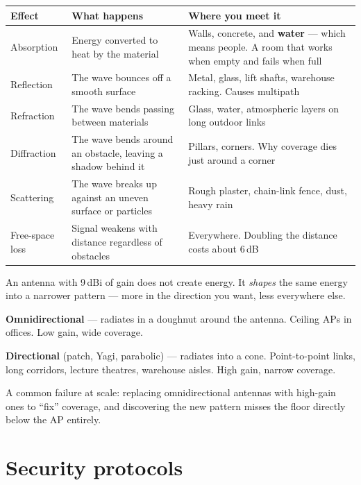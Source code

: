 \begin{longtable}{@{}L{3.2cm}L{5.6cm}L{6.2cm}@{}}
\toprule
{}
\textbf{Effect} & \textbf{What happens} & \textbf{Where you meet it} \\
\midrule
\endhead
Absorption &
Energy converted to heat by the material &
Walls, concrete, and \textbf{water} --- which means people. A room that works
when empty and fails when full \\
Reflection &
The wave bounces off a smooth surface &
Metal, glass, lift shafts, warehouse racking. Causes multipath \\
Refraction &
The wave bends passing between materials &
Glass, water, atmospheric layers on long outdoor links \\
Diffraction &
The wave bends around an obstacle, leaving a shadow behind it &
Pillars, corners. Why coverage dies just around a corner \\
Scattering &
The wave breaks up against an uneven surface or particles &
Rough plaster, chain-link fence, dust, heavy rain \\
Free-space loss &
Signal weakens with distance regardless of obstacles &
Everywhere. Doubling the distance costs about 6\,dB \\
\bottomrule
\end{longtable}

\begin{conceptbox}
An antenna with 9\,dBi of gain does not create energy. It \emph{shapes} the same
energy into a narrower pattern --- more in the direction you want, less
everywhere else.

\begin{tight}
  \item \textbf{Omnidirectional} --- radiates in a doughnut around the antenna.
        Ceiling APs in offices. Low gain, wide coverage.
  \item \textbf{Directional} (patch, Yagi, parabolic) --- radiates into a cone.
        Point-to-point links, long corridors, lecture theatres, warehouse aisles.
        High gain, narrow coverage.
\end{tight}

A common failure at scale: replacing omnidirectional antennas with high-gain ones
to ``fix'' coverage, and discovering the new pattern misses the floor directly
below the AP entirely.
\end{conceptbox}

\section{Security protocols}

